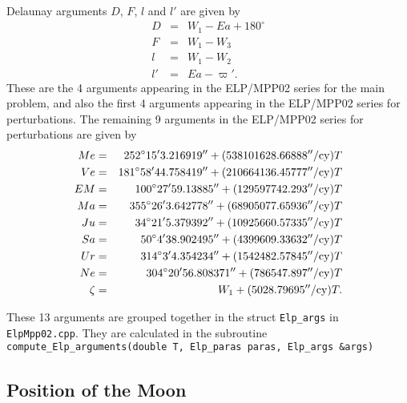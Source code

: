 \documentclass[12pt]{article}
\newcommand \beqn {\begin{eqnarray}}
\newcommand \eeqn {\end{eqnarray}}
\begin{document}
Delaunay arguments $D$, $F$, $l$ and $l'$ are given by 
\beqn
  D &=& W_1 - Ea + 180^\circ \\ 
  F &=& W_1-W_3 \\ 
  l &=& W_1-W_2 \\ 
  l' &=& Ea - \varpi' .
\eeqn
These are the 4 arguments appearing in the ELP/MPP02 series for the main problem, 
and also the first 4 arguments appearing in the ELP/MPP02 series for perturbations. 
The remaining 9 arguments in the ELP/MPP02 series for perturbations are given by 
\beqn
  Me &=& 252^\circ 15' 3.216919'' + (538101628.66888''/{\rm cy}) T \\ 
  Ve &=& 181^\circ 58' 44.758419'' + (210664136.45777''/{\rm cy}) T \\ 
  EM &=& 100^\circ 27' 59.13885'' + (129597742.293''/{\rm cy}) T \\
  Ma &=& 355^\circ 26' 3.642778'' + (68905077.65936''/{\rm cy}) T \\ 
  Ju &=& 34^\circ 21' 5.379392'' + (10925660.57335''/{\rm cy}) T \\ 
  Sa &=& 50^\circ 4' 38.902495'' + (4399609.33632''/{\rm cy}) T \\ 
  Ur &=& 314^\circ 3' 4.354234'' + (1542482.57845''/{\rm cy}) T \\
  Ne &=& 304^\circ 20' 56.808371'' + (786547.897''/{\rm cy}) T \\ 
  \zeta &=& W_1 + (5028.79695''/{\rm cy}) T .
\eeqn

These 13 arguments are grouped together in the struct {\tt Elp\_args} in 
{\tt ElpMpp02.cpp}. They are calculated in the subroutine \\
{\tt compute\_Elp\_arguments(double T, Elp\_paras paras, Elp\_args \&args)}

\subsection{Position of the Moon} 
\end{document}

